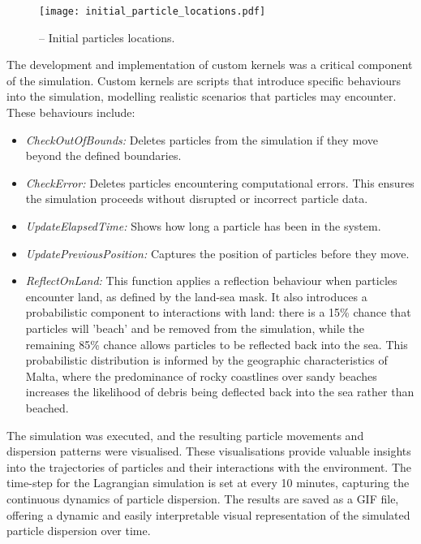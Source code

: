 \begin{figure}[H]
    \centering
    \texttt{[image: initial\_particle\_locations.pdf]}
    \caption[Initial particles locations.]{-- Initial particles locations.\label{fig_3.2}}
\end{figure}

The development and implementation of custom kernels was a critical component of the simulation. Custom kernels are scripts that introduce specific behaviours into the simulation, modelling realistic scenarios that particles may encounter. These behaviours include:

\begin{itemize}
    \item \textit{CheckOutOfBounds:} Deletes particles from the simulation if they move beyond the defined boundaries.
    \item \textit{CheckError:} Deletes particles encountering computational errors. This ensures the simulation proceeds without disrupted or incorrect particle data.
    \item \textit{UpdateElapsedTime:} Shows how long a particle has been in the system.
    \item \textit{UpdatePreviousPosition:} Captures the position of particles before they move.
    \item \textit{ReflectOnLand:} This function applies a reflection behaviour when particles encounter land, as defined by the land-sea mask. It also introduces a probabilistic component to interactions with land: there is a 15\% chance that particles will 'beach' and be removed from the simulation, while the remaining 85\% chance allows particles to be reflected back into the sea. This probabilistic distribution is informed by the geographic characteristics of Malta, where the predominance of rocky coastlines over sandy beaches increases the likelihood of debris being deflected back into the sea rather than beached.
\end{itemize}

The simulation was executed, and the resulting particle movements and dispersion patterns were visualised. These visualisations provide valuable insights into the trajectories of particles and their interactions with the environment. The time-step for the Lagrangian simulation is set at every 10 minutes, capturing the continuous dynamics of particle dispersion. The results are saved as a GIF file, offering a dynamic and easily interpretable visual representation of the simulated particle dispersion over time.

